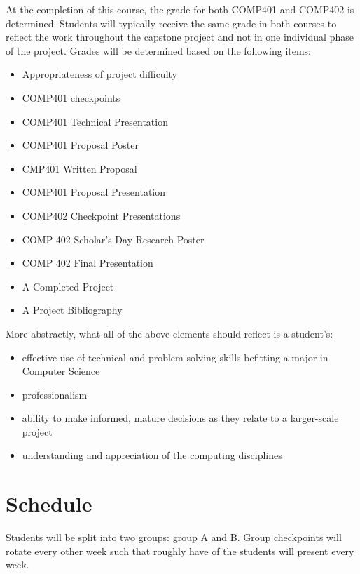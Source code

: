\documentclass[10pt]{article}
\begin{document}
At the completion of this course, the grade for both COMP401 and COMP402 is determined. Students will typically receive the same grade in both courses to reflect the work throughout the capstone project and not in one individual phase of the project. Grades will be determined based on the following items:
\begin{itemize}
\item Appropriateness of project difficulty
\item COMP401 checkpoints
\item COMP401 Technical Presentation
\item COMP401 Proposal Poster
\item CMP401 Written Proposal
\item COMP401 Proposal Presentation
\item COMP402 Checkpoint Presentations
\item COMP 402 Scholar's Day Research Poster
\item COMP 402 Final Presentation
\item A Completed Project
\item A Project Bibliography
\end{itemize}

More abstractly, what all of the above elements should reflect is a student's:
\begin{itemize}
\item effective use of technical and problem solving skills befitting a major in Computer Science
\item professionalism
\item ability to make informed, mature decisions as they relate to a larger-scale project
\item understanding and appreciation of the computing disciplines
\end{itemize}

\section{Schedule}

Students will be split into two groups: group A and B. Group checkpoints will rotate every other week such that roughly have of the students will present every week.
\end{document}
